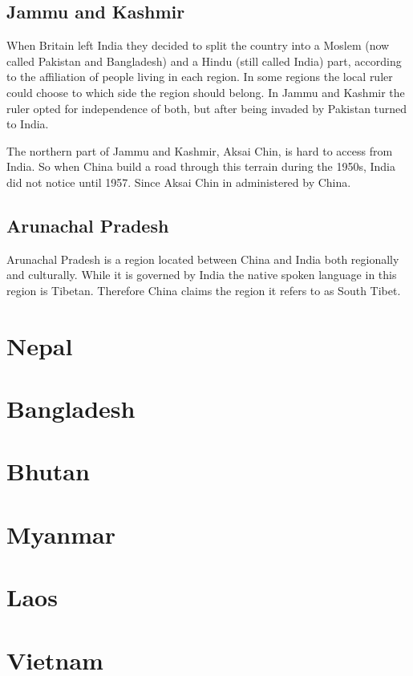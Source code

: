 \documentclass[conference]{IEEEtran}
\begin{document}
	\subsection{Jammu and Kashmir}
	When Britain left India they decided to split the country into a Moslem (now called Pakistan and Bangladesh) and a Hindu (still called India) part, according to the affiliation of people living in each region. In some regions the local ruler could choose to which side the region should belong. In Jammu and Kashmir the ruler opted for independence of both, but after being invaded by Pakistan turned to India.
	
	The northern part of Jammu and Kashmir, Aksai Chin, is hard to access from India. So when China build a road through this terrain during the 1950s, India did not notice until 1957. Since Aksai Chin in administered by China.
	
	\subsection{Arunachal Pradesh}
	Arunachal Pradesh is a region located between China and India both regionally and culturally. While it is governed by India the native spoken language in this region is Tibetan. Therefore China claims the region it refers to as South Tibet.
	
	\section{Nepal}
	
	\section{Bangladesh}
	
	\section{Bhutan}
	
	\section{Myanmar}
	
	\section{Laos}
	
	\section{Vietnam}
	
\end{document}
